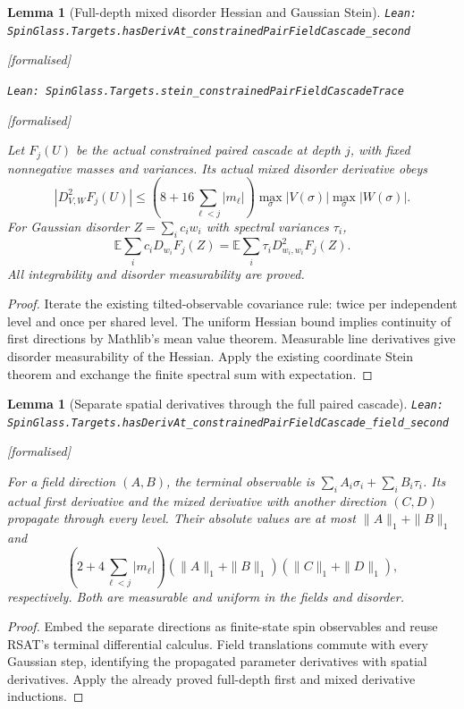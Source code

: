 \documentclass[11pt]{article}
\providecommand{\lean}[1]{\leavevmode\par\nopagebreak
  {\noindent\normalfont\footnotesize\raggedright\texttt{Lean: #1}\par}\nopagebreak}
\providecommand{\leanok}{\par\nopagebreak
  {\noindent\normalfont\footnotesize\textcolor{green!50!black}{[formalised]}\par}\nopagebreak}
\newtheorem{lemma}[theorem]{Lemma}
\begin{document}
\begin{lemma}[Full-depth mixed disorder Hessian and Gaussian Stein]
\lean{SpinGlass.Targets.hasDerivAt\_constrainedPairFieldCascade\_second}\leanok
\lean{SpinGlass.Targets.stein\_constrainedPairFieldCascadeTrace}\leanok
Let $F_j(U)$ be the actual constrained paired cascade at depth $j$, with
fixed nonnegative masses and variances. Its actual mixed disorder derivative obeys
\[
 |D^2_{V,W}F_j(U)|\le
 \left(8+16\sum_{\ell<j}|m_\ell|\right)
 \max_\sigma|V(\sigma)|\max_\sigma|W(\sigma)|.
\]
For Gaussian disorder $Z=\sum_i c_i w_i$ with spectral variances $\tau_i$,
\[
 \mathbb E\sum_i c_i D_{w_i}F_j(Z)
 =\mathbb E\sum_i\tau_i D^2_{w_i,w_i}F_j(Z).
\]
All integrability and disorder measurability are proved.
\end{lemma}
\begin{proof}
Iterate the existing tilted-observable covariance rule: twice per independent
level and once per shared level. The uniform Hessian bound implies continuity
of first directions by Mathlib's mean value theorem. Measurable line derivatives
give disorder measurability of the Hessian. Apply the existing coordinate Stein
theorem and exchange the finite spectral sum with expectation.
\end{proof}

\begin{lemma}[Separate spatial derivatives through the full paired cascade]
\lean{SpinGlass.Targets.hasDerivAt\_constrainedPairFieldCascade\_field\_second}\leanok
For a field direction $(A,B)$, the terminal observable is
$\sum_i A_i\sigma_i+\sum_i B_i\tau_i$. Its actual first derivative and the
mixed derivative with another direction $(C,D)$ propagate through every level.
Their absolute values are at most $\|A\|_1+\|B\|_1$ and
\[
 \left(2+4\sum_{\ell<j}|m_\ell|\right)
 (\|A\|_1+\|B\|_1)(\|C\|_1+\|D\|_1),
\]
respectively. Both are measurable and uniform in the fields and disorder.
\end{lemma}
\begin{proof}
Embed the separate directions as finite-state spin observables and reuse RSAT's
terminal differential calculus. Field translations commute with every Gaussian
step, identifying the propagated parameter derivatives with spatial derivatives.
Apply the already proved full-depth first and mixed derivative inductions.
\end{proof}
\end{document}
